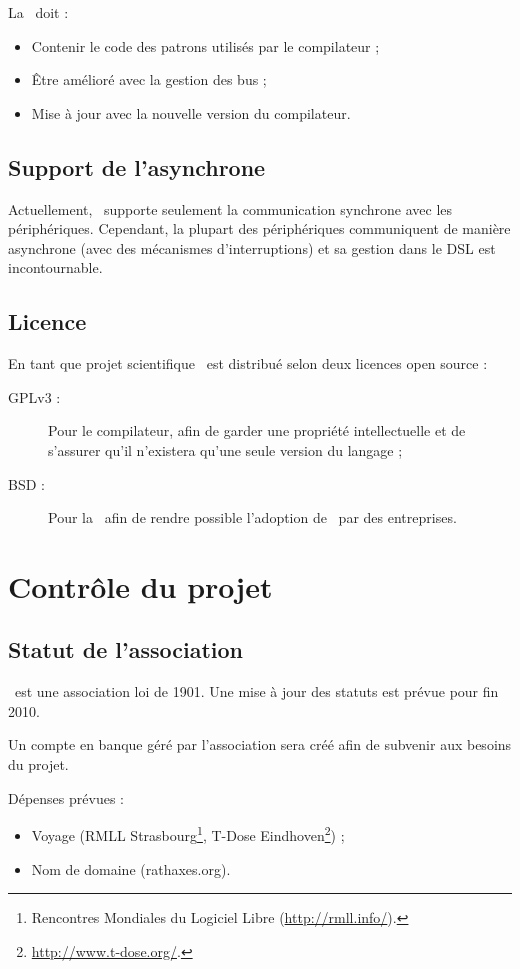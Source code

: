 \documentclass{rtxreport}
\begin{document}
La \BL\ doit :
\begin{itemize}
\item Contenir le code des patrons utilisés par le compilateur ;
\item Être amélioré avec la gestion des bus ;
\item Mise \`a jour avec la nouvelle version du compilateur.
\end{itemize}

\section{Support de l'asynchrone}

Actuellement, \rtx\ supporte seulement la communication synchrone avec les
périphériques. Cependant, la plupart des périphériques communiquent de manière
asynchrone (avec des mécanismes d'interruptions) et sa gestion dans le DSL est
incontournable.

\section{Licence}

En tant que projet scientifique \rtx\ est distribué selon deux licences open
source :
\begin{description}
\item[GPLv3 :] Pour le compilateur, afin de garder une propriété intellectuelle
et de s'assurer qu'il n'existera qu'une seule version du langage ;
\item[BSD :] Pour la \BL\ afin de rendre possible l'adoption de \rtx\ par des
entreprises.
\end{description}

\chapter{Contrôle du projet}

\section{Statut de l'association}

\rtx\ est une association loi de 1901. Une mise à jour des statuts est
prévue pour fin 2010.

Un compte en banque géré par l'association sera créé afin de subvenir aux
besoins du projet.

Dépenses prévues :
\begin{itemize}
\item Voyage (RMLL Strasbourg\footnote{Rencontres Mondiales du Logiciel
Libre (\url{http://rmll.info/}).}, T-Dose
Eindhoven\footnote{\url{http://www.t-dose.org/}.}) ;
\item Nom de domaine (rathaxes.org).
\end{itemize}
\end{document}
